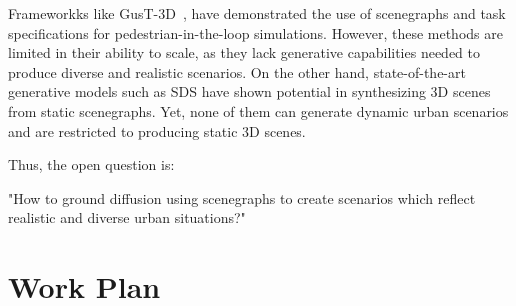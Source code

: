 \documentclass{article}
\begin{document}
Frameworkks like GusT-3D~\cite{wu2022designing}, have demonstrated the use of scenegraphs and task specifications for pedestrian-in-the-loop simulations. However, these methods are limited in their ability to scale, as they lack generative capabilities needed to produce diverse and realistic scenarios. On the other hand, state-of-the-art generative models such as SDS have shown potential in synthesizing 3D scenes from static scenegraphs. Yet, none of them can generate dynamic urban scenarios and are restricted to producing static 3D scenes.

Thus, the open question is:

"How to ground diffusion using scenegraphs to create scenarios which reflect realistic and diverse urban situations?"

\section{Work Plan}






\end{document}
